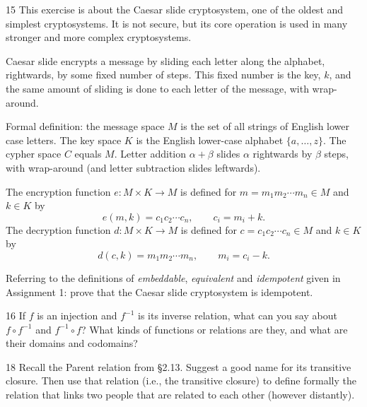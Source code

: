 \documentclass[11pt]{article}
\begin{document}
\begin{exercise}{15}
    This exercise is about the Caesar slide cryptosystem, one of the
    oldest and simplest cryptosystems. It is not secure, but its core
    operation is used in many stronger and more complex
    cryptosystems.

    Caesar slide encrypts a message by sliding each letter along the
    alphabet, rightwards, by some fixed number of steps. This fixed
    number is the key, $k$, and the same amount of sliding is done to
    each letter of the message, with wrap-around.

    Formal definition: the message space $M$ is the set of all
    strings of English lower case letters. The key space $K$ is the
    English lower-case alphabet $\{a,\dots,z\}$. The cypher space $C$
    equals $M$. Letter addition $\alpha+\beta$ slides $\alpha$
    rightwards by $\beta$ steps, with wrap-around (and letter
    subtraction slides leftwards).

    The encryption function $e: M\times K\to M$ is defined for
    $m=m_1m_2\cdots m_n\in M$ and $k\in K$ by
    \[
        e(m,k) = c_1c_2\cdots c_n, \qquad c_i = m_i+k.
    \]
    The decryption function $d: M\times K\to M$ is defined for
    $c=c_1c_2\cdots c_n\in M$ and $k\in K$ by
    \[
        d(c,k) = m_1m_2\cdots m_n, \qquad m_i = c_i-k.
    \]

    Referring to the definitions of \emph{embeddable}, \emph{
    equivalent} and \emph{idempotent} given in Assignment 1: prove
    that the Caesar slide cryptosystem is idempotent.
\end{exercise}
\begin{solution}

\end{solution}

\begin{exercise}{16}
    If $f$ is an injection and $f^{-1}$ is its inverse relation, what
    can you say about $f\circ f^{-1}$ and $f^{-1}\circ f$? What kinds
    of functions or relations are they, and what are their domains
    and codomains?
\end{exercise}
\begin{solution}

\end{solution}

\begin{exercise}{18}
    Recall the Parent relation from \S2.13. Suggest a good name for
    its transitive closure. Then use that relation (i.e., the
    transitive closure) to define formally the relation that links
    two people that are related to each other (however distantly).
\end{exercise}
\begin{solution}

\end{solution}
\end{document}
